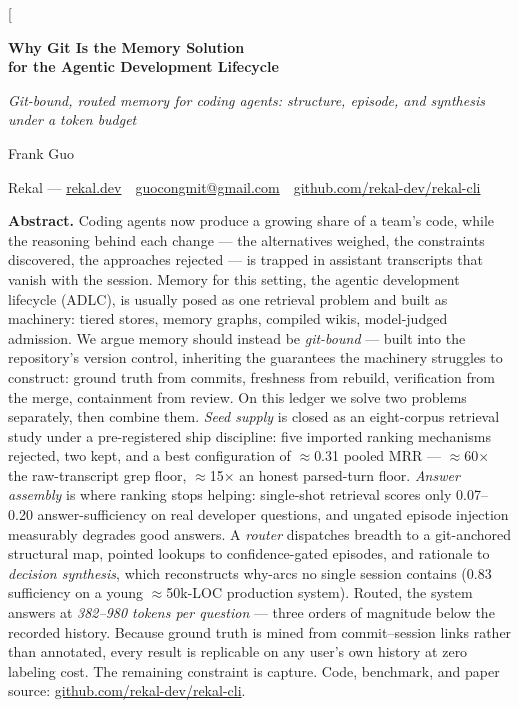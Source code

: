 \documentclass[twocolumn,10pt]{article}
\newcommand{\x}{$\times$}
\begin{document}
\twocolumn[
\vspace*{-22pt}
\begin{center}
{\LARGE\bfseries\setlength{\baselineskip}{22pt} Why Git Is the Memory Solution\\ for the Agentic Development Lifecycle\par}
\vspace{8pt}
{\normalsize\itshape Git-bound, routed memory for coding agents: structure, episode, and synthesis under a token budget\par}
\vspace{12pt}
{\normalsize Frank Guo\par}
\vspace{2pt}
{\small Rekal --- \href{https://rekal.dev}{rekal.dev} \,\textperiodcentered\, \href{mailto:guocongmit@gmail.com}{guocongmit@gmail.com} \,\textperiodcentered\, \href{https://github.com/rekal-dev/rekal-cli}{github.com/rekal-dev/rekal-cli}\par}
\end{center}
\vspace{6pt}
\begin{center}
\begin{minipage}{0.92\textwidth}
\small\noindent\textbf{Abstract.}
Coding agents now produce a growing share of a team's code, while the reasoning behind each change --- the alternatives weighed, the constraints discovered, the approaches rejected --- is trapped in assistant transcripts that vanish with the session. Memory for this setting, the agentic development lifecycle (ADLC), is usually posed as one retrieval problem and built as machinery: tiered stores, memory graphs, compiled wikis, model-judged admission. We argue memory should instead be \emph{git-bound} --- built into the repository's version control, inheriting the guarantees the machinery struggles to construct: ground truth from commits, freshness from rebuild, verification from the merge, containment from review. On this ledger we solve two problems separately, then combine them. \emph{Seed supply} is closed as an eight-corpus retrieval study under a pre-registered ship discipline: five imported ranking mechanisms rejected, two kept, and a best configuration of $\approx$0.31 pooled MRR --- $\approx$60\x{} the raw-transcript grep floor, $\approx$15\x{} an honest parsed-turn floor. \emph{Answer assembly} is where ranking stops helping: single-shot retrieval scores only 0.07--0.20 answer-sufficiency on real developer questions, and ungated episode injection measurably degrades good answers. A \emph{router} dispatches breadth to a git-anchored structural map, pointed lookups to confidence-gated episodes, and rationale to \emph{decision synthesis}, which reconstructs why-arcs no single session contains (0.83 sufficiency on a young $\approx$50k-LOC production system). Routed, the system answers at \emph{382--980 tokens per question} --- three orders of magnitude below the recorded history. Because ground truth is mined from commit--session links rather than annotated, every result is replicable on any user's own history at zero labeling cost. The remaining constraint is capture. Code, benchmark, and paper source: \href{https://github.com/rekal-dev/rekal-cli}{github.com/rekal-dev/rekal-cli}.
\end{minipage}
\end{center}
\end{document}
